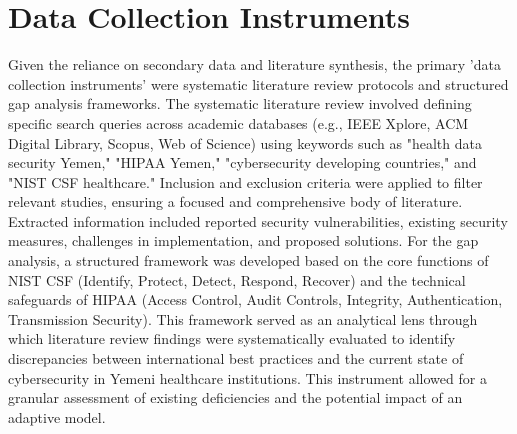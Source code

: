 \documentclass[12pt, a4paper, oneside]{report}
\begin{document}
	\section{Data Collection Instruments}
	Given the reliance on secondary data and literature synthesis, the primary 'data collection instruments' were systematic literature review protocols and structured gap analysis frameworks. The systematic literature review involved defining specific search queries across academic databases (e.g., IEEE Xplore, ACM Digital Library, Scopus, Web of Science) using keywords such as "health data security Yemen," "HIPAA Yemen," "cybersecurity developing countries," and "NIST CSF healthcare." Inclusion and exclusion criteria were applied to filter relevant studies, ensuring a focused and comprehensive body of literature. Extracted information included reported security vulnerabilities, existing security measures, challenges in implementation, and proposed solutions. For the gap analysis, a structured framework was developed based on the core functions of NIST CSF (Identify, Protect, Detect, Respond, Recover) and the technical safeguards of HIPAA (Access Control, Audit Controls, Integrity, Authentication, Transmission Security). This framework served as an analytical lens through which literature review findings were systematically evaluated to identify discrepancies between international best practices and the current state of cybersecurity in Yemeni healthcare institutions. This instrument allowed for a granular assessment of existing deficiencies and the potential impact of an adaptive model.
	
\end{document}
